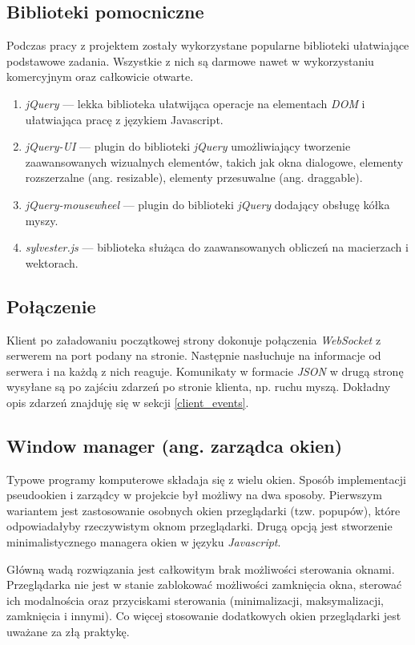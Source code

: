 \subsection{Biblioteki pomocniczne}
Podczas pracy z projektem zostały wykorzystane popularne biblioteki ułatwiające podstawowe zadania. Wszystkie z nich są darmowe nawet w wykorzystaniu komercyjnym oraz całkowicie otwarte.
\begin{enumerate}
  \item \emph{jQuery} --- lekka biblioteka ułatwijąca operacje na elementach \emph{DOM} i ułatwiająca pracę z językiem Javascript.
  \item \emph{jQuery-UI} --- plugin do biblioteki \emph{jQuery} umożliwiający tworzenie zaawansowanych wizualnych elementów, takich jak okna dialogowe, elementy rozszerzalne (ang. resizable), elementy przesuwalne (ang. draggable).
  \item \emph{jQuery-mousewheel} --- plugin do biblioteki \emph{jQuery} dodający obsługę kółka myszy.
  \item \emph{sylvester.js} --- biblioteka służąca do zaawansowanych obliczeń na macierzach i wektorach.
\end{enumerate}


\subsection{Połączenie}
Klient po załadowaniu początkowej strony dokonuje połączenia \emph{WebSocket} z serwerem na port podany na stronie. Następnie nasłuchuje na informacje od serwera i na każdą z nich reaguje. Komunikaty w formacie \emph{JSON} w drugą stronę wysyłane są po zajściu zdarzeń po stronie klienta, np. ruchu myszą. Dokładny opis zdarzeń znajduję się w sekcji \ref{client_events}.

\subsection{Window manager (ang. zarządca okien)}
Typowe programy komputerowe składaja się z wielu okien. Sposób implementacji pseudookien i zarządcy w projekcie był możliwy na dwa sposoby.
Pierwszym wariantem jest zastosowanie osobnych okien przeglądarki (tzw. popupów), które odpowiadałyby rzeczywistym oknom przeglądarki.
Drugą opcją jest stworzenie minimalistycznego managera okien w języku \emph{Javascript}.

Główną wadą rozwiązania jest całkowitym brak możliwości sterowania oknami. Przeglądarka nie jest w stanie zablokować możliwości zamknięcia okna, sterować ich modalnościa oraz przyciskami sterowania (minimalizacji, maksymalizacji, zamknięcia i innymi). Co więcej stosowanie dodatkowych okien przeglądarki jest uważane za złą praktykę.

